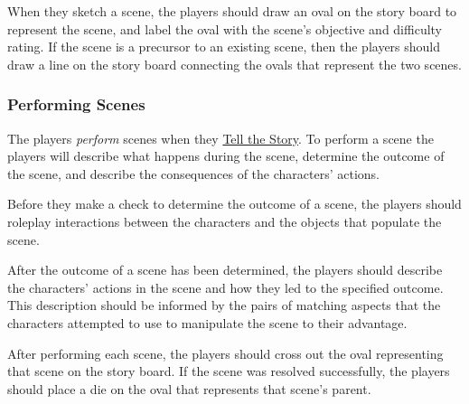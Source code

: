 \documentclass[12pt, a5paper, parskip=half-, footheight=1.4cm]{scrartcl}
\begin{document}
When they sketch a scene, the players should draw an oval on the story board to represent the scene, and label the oval with the scene's objective and difficulty rating.
If the scene is a precursor to an existing scene, then the players should draw a line on the story board connecting the ovals that represent the two scenes.

\subsubsection*{Performing Scenes} \label{subsubsection:performing-scenes}
The players \emph{perform} scenes when they \hyperref[subsection:tell-the-story]{\cinzel \small Tell the Story}.
To perform a scene the players will describe what happens during the scene, determine the outcome of the scene, and describe the consequences of the characters' actions.

Before they make a check to determine the outcome of a scene, the players should roleplay interactions between the characters and the objects that populate the scene.

After the outcome of a scene has been determined, the players should describe the characters' actions in the scene and how they led to the specified outcome.
This description should be informed by the pairs of matching aspects that the characters attempted to use to manipulate the scene to their advantage.

After performing each scene, the players should cross out the oval representing that scene on the story board. If the scene was resolved successfully, the players should place a die on the oval that represents that scene's parent.
\newpage
\end{document}
